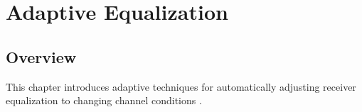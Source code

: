 \chapter{Adaptive Equalization}

\section{Overview}

This chapter introduces adaptive techniques for automatically
adjusting receiver equalization to changing channel conditions
\citep{palermo2025ecen720}.





